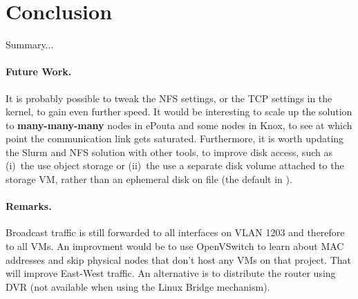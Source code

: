 \section{Conclusion}
\label{section:conclusion}

Summary...
\vspace{1cm}

\paragraph{Future Work.}
%
It is probably possible to tweak the NFS settings, or the TCP settings
in the kernel, to gain even further speed.
%
It would be interesting to scale up the solution to
\textbf{many-many-many} nodes in ePouta and some nodes in Knox, to see
at which point the communication link gets saturated.
%
Furthermore, it is worth updating the Slurm and NFS solution with
other tools, to improve disk access, such as (i)~the use object
storage or (ii)~the use a separate disk volume attached to the storage
VM, rather than an ephemeral disk on file (\ie the default in
).

\paragraph{Remarks.}
%
Broadcast traffic is still forwarded to all interfaces on VLAN 1203
and therefore to all VMs. An improvment would be to use OpenVSwitch to
learn about MAC addresses and skip physical nodes that don't host any
VMs on that project. That will improve East-West traffic. An
alternative is to distribute the router using DVR (not available when
using the Linux Bridge mechanism).

